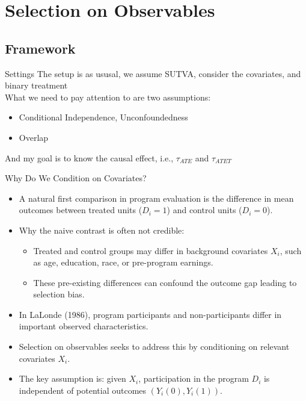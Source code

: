 \documentclass[11pt,aspectratio=169]{beamer}
\begin{document}
\section{Selection on Observables}


\subsection{Framework}



\begin{frame}{Settings}
The setup is as ususal, we assume SUTVA, consider the covariates, and binary treatment \\
What we need to pay attention to are two assumptions:
\begin{itemize}
  \item Conditional Independence, Unconfoundedness
  \item Overlap
\end{itemize}
And my goal is to know the causal effect, i.e., $\tau_{ATE}$ and $\tau_{ATET}$
\end{frame}


\begin{frame}{Why Do We Condition on Covariates?}

\begin{itemize}
    \item A natural first comparison in program evaluation is the difference in mean outcomes between treated units ($D_i = 1$) and control units ($D_i = 0$).
    \item Why the naive contrast is often not credible:
    \begin{itemize}
        \item[$\blacksquare$] Treated and control groups may differ in background covariates $X_i$, such as age, education, race, or pre-program earnings.
        \item[$\blacksquare$] These pre-existing differences can confound the outcome gap leading to selection bias.
    \end{itemize}
    \item In LaLonde (1986), program participants and non-participants differ in important observed characteristics.
    \item Selection on observables seeks to address this by conditioning on relevant covariates $X_i$.
    \item The key assumption is: given $X_i$, participation in the program $D_i$ is independent of potential outcomes $(Y_i(0), Y_i(1))$.
\end{itemize}

\end{frame}
\end{document}
